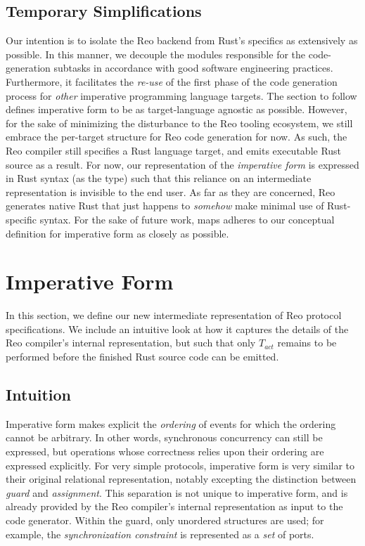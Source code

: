 \subsection{Temporary Simplifications}
Our intention is to isolate the Reo backend from Rust's specifics as extensively as possible. In this manner, we decouple the modules responsible for the code-generation subtasks in accordance with good software engineering practices. Furthermore, it facilitates the \textit{re-use} of the first phase of the code generation process for \textit{other} imperative programming language targets. The section to follow defines imperative form to be as target-language agnostic as possible. However, for the sake of minimizing the disturbance to the Reo tooling ecosystem, we still embrace the per-target structure for Reo code generation for now. As such, the Reo compiler still specifies a Rust language target, and emits executable Rust source as a result. For now, our representation of the \textit{imperative form} is expressed in Rust syntax (as the  type) such that this reliance on an intermediate representation is invisible to the end user. As far as they are concerned, Reo generates native Rust that just happens to \textit{somehow} make minimal use of Rust-specific syntax. For the sake of future work,  maps adheres to our conceptual definition for imperative form as closely as possible.


\section{Imperative Form}
In this section, we define our new intermediate representation of Reo protocol specifications. We include an intuitive look at how it captures the details of the Reo compiler's internal representation, but such that only $T_{act}$ remains to be performed before the finished Rust source code can be emitted.


\subsection{Intuition}
Imperative form makes explicit the \textit{ordering} of events for which the ordering cannot be arbitrary. In other words, synchronous concurrency can still be expressed, but operations whose correctness relies upon their ordering are expressed explicitly. For very simple protocols, imperative form is very similar to their original relational representation, notably excepting the distinction between \textit{guard} and \textit{assignment}. This separation is not unique to imperative form, and is already provided by the Reo compiler's internal representation as input to the code generator. Within the guard, only unordered structures are used; for example, the \textit{synchronization constraint} is represented as a \textit{set} of ports.

